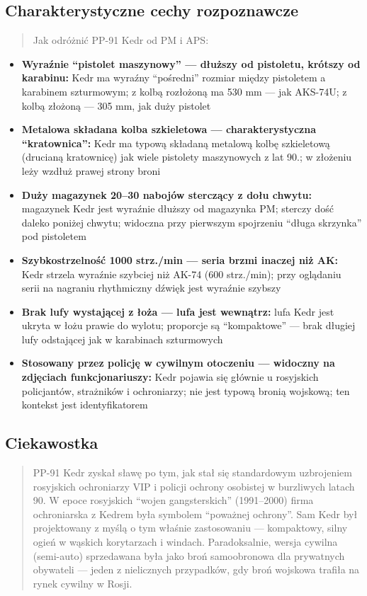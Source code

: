 \documentclass[12pt,oneside]{book}
\providecommand{\tightlist}{%
  \setlength{\itemsep}{0pt}\setlength{\parskip}{0pt}}
\begin{document}
\subsection{Charakterystyczne cechy
rozpoznawcze}\label{charakterystyczne-cechy-rozpoznawcze-111}

\begin{quote}
Jak odróżnić PP-91 Kedr od PM i APS:
\end{quote}

\begin{itemize}
\tightlist
\item
  \textbf{Wyraźnie ``pistolet maszynowy'' --- dłuższy od pistoletu,
  krótszy od karabinu:} Kedr ma wyraźny ``pośredni'' rozmiar między
  pistoletem a karabinem szturmowym; z kolbą rozłożoną ma 530 mm --- jak
  AKS-74U; z kolbą złożoną --- 305 mm, jak duży pistolet
\item
  \textbf{Metalowa składana kolba szkieletowa --- charakterystyczna
  ``kratownica'':} Kedr ma typową składaną metalową kolbę szkieletową
  (drucianą kratownicę) jak wiele pistolety maszynowych z lat 90.; w
  złożeniu leży wzdłuż prawej strony broni
\item
  \textbf{Duży magazynek 20--30 nabojów sterczący z dołu chwytu:}
  magazynek Kedr jest wyraźnie dłuższy od magazynka PM; sterczy dość
  daleko poniżej chwytu; widoczna przy pierwszym spojrzeniu ``długa
  skrzynka'' pod pistoletem
\item
  \textbf{Szybkostrzelność 1000 strz./min --- seria brzmi inaczej niż
  AK:} Kedr strzela wyraźnie szybciej niż AK-74 (600 strz./min); przy
  oglądaniu serii na nagraniu rhythmiczny dźwięk jest wyraźnie szybszy
\item
  \textbf{Brak lufy wystającej z łoża --- lufa jest wewnątrz:} lufa Kedr
  jest ukryta w łożu prawie do wylotu; proporcje są ``kompaktowe'' ---
  brak długiej lufy odstającej jak w karabinach szturmowych
\item
  \textbf{Stosowany przez policję w cywilnym otoczeniu --- widoczny na
  zdjęciach funkcjonariuszy:} Kedr pojawia się głównie u rosyjskich
  policjantów, strażników i ochroniarzy; nie jest typową bronią
  wojskową; ten kontekst jest identyfikatorem
\end{itemize}

\subsection{Ciekawostka}\label{ciekawostka-111}

\begin{quote}
PP-91 Kedr zyskał sławę po tym, jak stał się standardowym uzbrojeniem
rosyjskich ochroniarzy VIP i policji ochrony osobistej w burzliwych
latach 90. W epoce rosyjskich ``wojen gangsterskich'' (1991--2000) firma
ochroniarska z Kedrem była symbolem ``poważnej ochrony''. Sam Kedr był
projektowany z myślą o tym właśnie zastosowaniu --- kompaktowy, silny
ogień w wąskich korytarzach i windach. Paradoksalnie, wersja cywilna
(semi-auto) sprzedawana była jako broń samoobronowa dla prywatnych
obywateli --- jeden z nielicznych przypadków, gdy broń wojskowa trafiła
na rynek cywilny w Rosji.
\end{quote}
\end{document}
